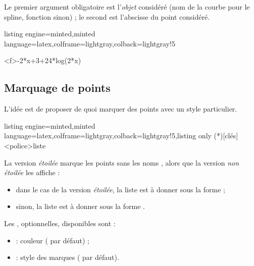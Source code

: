 \documentclass[11pt,a4paper]{ltxdoc}
\begin{document}
Le premier argument obligatoire est l'\textit{objet} considéré (nom de la courbe pour le spline, fonction sinon) ; le second est l'abscisse du point considéré.

\begin{tcblisting}{listing engine=minted,minted language=latex,colframe=lightgray,colback=lightgray!5}
\begin{GraphiqueTikz}%
	[x=0.9cm,y=0.425cm,Xmin=4,Xmax=20,Origx=4,
	Ymin=40,Ymax=56,Ygrille=2,Ygrilles=1,Origy=40]
	{-2*x+3+24*log(2*x)}
\end{GraphiqueTikz}
\end{tcblisting}

\pagebreak

\subsection{Marquage de points}\label{markpts}

L'idée est de proposer de quoi marquer des points avec un style particulier.

\begin{tcblisting}{listing engine=minted,minted language=latex,colframe=lightgray,colback=lightgray!5,listing only}
\MarquerPts(*)[clés]<police>{liste}
\end{tcblisting}

La version \textit{étoilée} marque les points sans les \og noms \fg, alors que la version \textit{non étoilée} les affiche :

\begin{itemize}
	\item dans le cas de la version \textit{étoilée}, la liste est à donner sous la forme  ;
	\item sinon, la liste est à donner sous la forme .
\end{itemize}

\smallskip

Les \MontreCode{[clés]}, optionnelles, disponibles sont :

\smallskip

\begin{itemize}
	\item {} : couleur ( par défaut) ;
	\item {} : style des marques ( par défaut).
\end{itemize}
\end{document}
